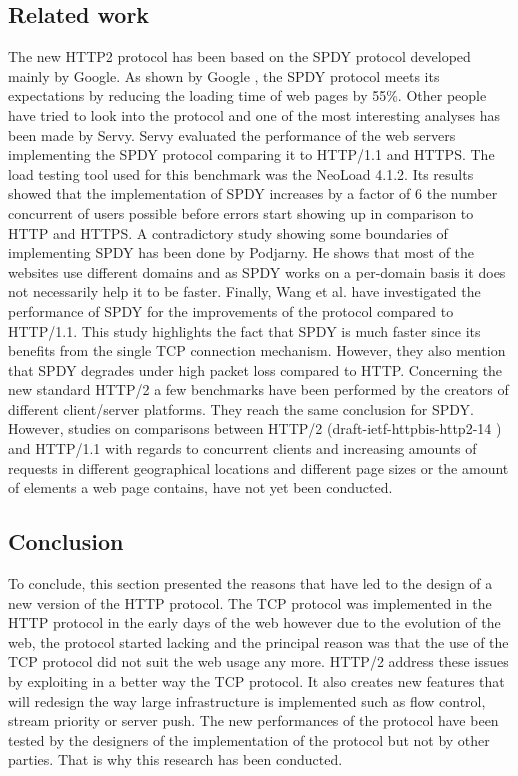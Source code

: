 \subsection{Related work}
The new HTTP2 protocol has been based on the SPDY protocol developed mainly by Google. As shown by Google \cite{google2x}, the SPDY protocol meets its expectations by reducing the loading time of web pages by 55\%. Other people have tried to look into the protocol and one of the most interesting analyses has been made by Servy\cite{servy}. Servy evaluated the performance of the web servers implementing the SPDY protocol comparing it to HTTP/1.1 and HTTPS. The load testing tool used for this benchmark was the NeoLoad 4.1.2. Its results showed that the implementation of SPDY increases by a factor of 6 the number concurrent of users possible before errors start showing up in comparison to HTTP and HTTPS. 
A contradictory study showing some boundaries of implementing SPDY has been done by Podjarny\cite{podiatry}. He shows that most of the websites use different domains and as SPDY works on a per-domain basis it does not necessarily help it to be faster. Finally, Wang et al.\cite{wang} have investigated the performance of SPDY for the improvements of the protocol compared to HTTP/1.1. This study highlights the fact that SPDY is much faster since its benefits from the single TCP connection mechanism. However, they also mention that SPDY degrades under high packet loss compared to HTTP. 
Concerning the new standard HTTP/2 a few benchmarks have been performed by the creators of different client/server platforms. They reach the same conclusion for SPDY. \\
However, studies on comparisons between HTTP/2 (draft-ietf-httpbis-http2-14 \cite{h2c-14} ) and HTTP/1.1 with regards to concurrent clients and increasing amounts of requests in different geographical locations and different page sizes or the amount of elements a web page contains, have not yet been conducted.

\subsection{Conclusion}
To conclude, this section presented the reasons that have led to the design of a new version of the HTTP protocol. The TCP protocol was implemented in the HTTP protocol in the early days of the web however due to the evolution of the web, the protocol started lacking and the principal reason was that the use of the TCP protocol did not suit the web usage any more. HTTP/2 address these issues by exploiting in a better way the TCP protocol. It also creates new features that will redesign the way large infrastructure is implemented such as flow control, stream priority or server push. The new performances of the protocol have been tested by the designers of the implementation of the protocol but not by other parties. That is why this research has been conducted.